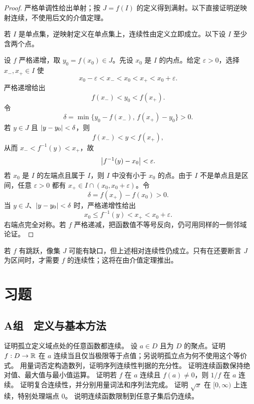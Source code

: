 \begin{proof}
严格单调性给出单射；按 \(J=f(I)\) 的定义得到满射。以下直接证明逆映射连续，不使用后文的介值定理。

若 \(I\) 是单点集，逆映射定义在单点集上，连续性由定义立即成立。以下设 \(I\) 至少含两个点。

设 \(f\) 严格递增，取 \(y_0=f(x_0)\in J\)。先设 \(x_0\) 是 \(I\) 的内点。给定 \(\varepsilon>0\)，选择 \(x_-,x_+\in I\) 使
\[
 x_0-\varepsilon<x_-<x_0<x_+<x_0+\varepsilon.
\]
严格递增给出
\[
 f(x_-)<y_0<f(x_+).
\]
令
\[
 \delta=\min\{y_0-f(x_-),\,f(x_+)-y_0\}>0.
\]
若 \(y\in J\) 且 \(\left|y-y_0\right|<\delta\)，则
\[
 f(x_-)<y<f(x_+),
\]
从而 \(x_-<f^{-1}(y)<x_+\)，故
\[
 \left|f^{-1}(y)-x_0\right|<\varepsilon.
\]
若 \(x_0\) 是 \(I\) 的左端点且属于 \(I\)，则 \(I\) 中没有小于 \(x_0\) 的点。由于 \(I\) 不是单点且是区间，任意 \(\varepsilon>0\) 都有 \(x_+\in I\cap(x_0,x_0+\varepsilon)\)。令
\[
 \delta=f(x_+)-f(x_0)>0.
\]
当 \(y\in J\)、\(\left|y-y_0\right|<\delta\) 时，严格递增性给出
\[
 x_0\le f^{-1}(y)<x_+<x_0+\varepsilon.
\]
右端点完全对称。若 \(f\) 严格递减，把函数值不等号反向，仍可用同样的一侧邻域论证。
\end{proof}

若 \(f\) 有跳跃，像集 \(J\) 可能有缺口，但上述相对连续性仍成立。只有在还要断言 \(J\) 为区间时，才需要 \(f\) 的连续性；这将在由介值定理推出。

\section*{习题}

\subsection*{A组　定义与基本方法}
\begin{enumerate}[label=\textbf{\thechapter.\arabic*.}]
  证明孤立定义域点处的任意函数都连续。
  设 \(a\in D\) 且为 \(D\) 的聚点。证明 \(f:D\to\mathbb{R}\) 在 \(a\) 连续当且仅当极限等于点值；另说明孤立点为何不使用这个等价式。
  用量词否定构造数列，证明序列连续性判据的充分性。
  证明连续函数保持绝对值、最大值与最小值运算。
  证明若 \(f\) 在 \(a\) 连续且 \(f(a)\ne0\)，则 \(1/f\) 在 \(a\) 连续。
  证明复合连续性，并分别用量词法和序列法完成。
  证明 \(\sqrt x\) 在 \([0,\infty)\) 上连续，特别处理端点 \(0\)。
  说明连续函数限制到任意子集后仍连续。
\end{enumerate}

